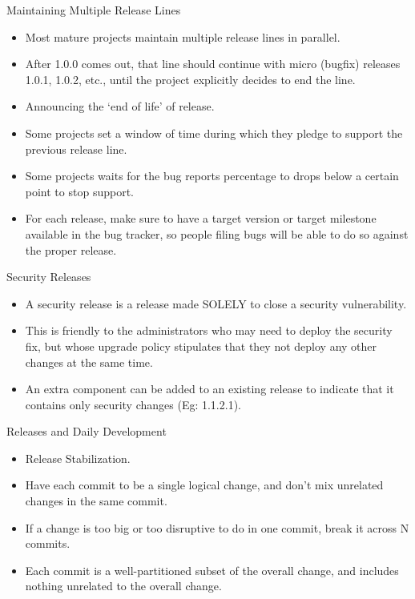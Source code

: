 \documentclass{beamer}
\begin{document}
\begin{frame}{Maintaining Multiple Release Lines}
\begin{itemize}
	\item Most mature projects maintain multiple release lines in parallel. 
	\item After 1.0.0 comes out, that line should continue with micro (bugfix) releases 1.0.1, 1.0.2, etc., until the project explicitly decides to end the line.
	\item Announcing the `end of life' of release. 
	\item Some projects set a window of time during which they pledge to support the previous release line. 
	\item Some projects waits for the bug reports percentage to drops below a certain point to stop support. 
	\item For each release, make sure to have a target version or target milestone available in the bug tracker, so people filing bugs will be able to do so against the proper release.
\end{itemize}
\end{frame}

\begin{frame}{Security Releases}
\begin{itemize}
	\item A security release is a release made SOLELY to close a security vulnerability. 
	\item This is friendly to the administrators who may need to deploy the security fix, but whose upgrade policy stipulates that they not deploy any other changes at the same time. 
	\item An extra component can be added to an existing release to indicate that it contains only security changes (Eg: 1.1.2.1).
\end{itemize}
\end{frame}

\begin{frame}{Releases and Daily Development}
\begin{itemize}
	\item Release Stabilization. 
	\item Have each commit to be a single logical change, and don't mix unrelated changes in the same commit. 
	\item If a change is too big or too disruptive to do in one commit, break it across N commits. 
	\item Each commit is a well-partitioned subset of the overall change, and includes nothing unrelated to the overall change.
\end{itemize}
\end{frame}
\end{document}
